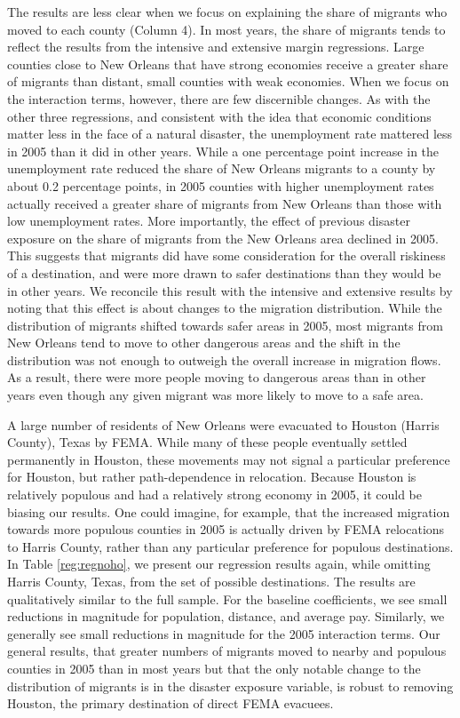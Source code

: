 \documentclass[]{article}
\begin{document}
The results are less clear when we focus on explaining the share of
migrants who moved to each county (Column 4). In most years, the share
of migrants tends to reflect the results from the intensive and
extensive margin regressions. Large counties close to New Orleans that
have strong economies receive a greater share of migrants than distant,
small counties with weak economies. When we focus on the interaction
terms, however, there are few discernible changes. As with the other
three regressions, and consistent with the idea that economic conditions
matter less in the face of a natural disaster, the unemployment rate
mattered less in 2005 than it did in other years. While a one percentage
point increase in the unemployment rate reduced the share of New Orleans
migrants to a county by about 0.2 percentage points, in 2005 counties
with higher unemployment rates actually received a greater share of
migrants from New Orleans than those with low unemployment rates. More
importantly, the effect of previous disaster exposure on the share of
migrants from the New Orleans area declined in 2005. This suggests that
migrants did have some consideration for the overall riskiness of a
destination, and were more drawn to safer destinations than they would
be in other years. We reconcile this result with the intensive and
extensive results by noting that this effect is about changes to the
migration distribution. While the distribution of migrants shifted
towards safer areas in 2005, most migrants from New Orleans tend to move
to other dangerous areas and the shift in the distribution was not
enough to outweigh the overall increase in migration flows. As a result,
there were more people moving to dangerous areas than in other years
even though any given migrant was more likely to move to a safe area.

A large number of residents of New Orleans were evacuated to Houston
(Harris County), Texas by FEMA. While many of these people eventually
settled permanently in Houston, these movements may not signal a
particular preference for Houston, but rather path-dependence in
relocation. Because Houston is relatively populous and had a relatively
strong economy in 2005, it could be biasing our results. One could
imagine, for example, that the increased migration towards more populous
counties in 2005 is actually driven by FEMA relocations to Harris
County, rather than any particular preference for populous destinations.
In Table \ref{reg:regnoho}, we present our regression results again,
while omitting Harris County, Texas, from the set of possible
destinations. The results are qualitatively similar to the full sample.
For the baseline coefficients, we see small reductions in magnitude for
population, distance, and average pay. Similarly, we generally see small
reductions in magnitude for the 2005 interaction terms. Our general
results, that greater numbers of migrants moved to nearby and populous
counties in 2005 than in most years but that the only notable change to
the distribution of migrants is in the disaster exposure variable, is
robust to removing Houston, the primary destination of direct FEMA
evacuees.
\end{document}
